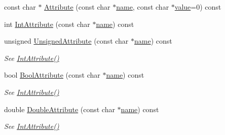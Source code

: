 \begin{DoxyCompactItemize}
\item 
const char $\ast$ \hyperlink{classtinyxml2_1_1_x_m_l_element_a48cf4a315cfbac7d74cd0d5ff2c5df51}{Attribute} (const char $\ast$\hyperlink{structname}{name}, const char $\ast$\hyperlink{unionvalue}{value}=0) const
\item 
int \hyperlink{classtinyxml2_1_1_x_m_l_element_acfaaeeadf0b0dbe56bb0f5ec12cb7736}{Int\+Attribute} (const char $\ast$\hyperlink{structname}{name}) const
\item 
\mbox{\label{classtinyxml2_1_1_x_m_l_element_a2a1daf6b090f53f5d34bcc71c646ea78}} 
unsigned \hyperlink{classtinyxml2_1_1_x_m_l_element_a2a1daf6b090f53f5d34bcc71c646ea78}{Unsigned\+Attribute} (const char $\ast$\hyperlink{structname}{name}) const
\begin{DoxyCompactList}\small\item\em See \hyperlink{classtinyxml2_1_1_x_m_l_element_acfaaeeadf0b0dbe56bb0f5ec12cb7736}{Int\+Attribute()} \end{DoxyCompactList}\item 
\mbox{\label{classtinyxml2_1_1_x_m_l_element_a07f6033f25eab7b246b57f4bff0758be}} 
bool \hyperlink{classtinyxml2_1_1_x_m_l_element_a07f6033f25eab7b246b57f4bff0758be}{Bool\+Attribute} (const char $\ast$\hyperlink{structname}{name}) const
\begin{DoxyCompactList}\small\item\em See \hyperlink{classtinyxml2_1_1_x_m_l_element_acfaaeeadf0b0dbe56bb0f5ec12cb7736}{Int\+Attribute()} \end{DoxyCompactList}\item 
\mbox{\label{classtinyxml2_1_1_x_m_l_element_a8948baa30b3a557d5ad84e7ab6d445fe}} 
double \hyperlink{classtinyxml2_1_1_x_m_l_element_a8948baa30b3a557d5ad84e7ab6d445fe}{Double\+Attribute} (const char $\ast$\hyperlink{structname}{name}) const
\begin{DoxyCompactList}\small\item\em See \hyperlink{classtinyxml2_1_1_x_m_l_element_acfaaeeadf0b0dbe56bb0f5ec12cb7736}{Int\+Attribute()} \end{DoxyCompactList}\item 
\mbox{\label{classtinyxml2_1_1_x_m_l_element_a69cf755f05fc76a320eb10770845ad8f}} 

\end{DoxyCompactItemize}
